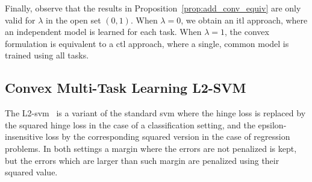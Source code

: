 Finally, observe that the results in Proposition~\ref{prop:add_conv_equiv} are only valid for $\lambda$ in the open set $(0, 1)$. 
When $\lambda=0$, we obtain an \acrshort{itl} approach, where an independent model is learned for each task. When $\lambda=1$, the convex formulation is equivalent to a \acrshort{ctl} approach, where a single, common model is trained using all tasks.






\subsection{Convex Multi-Task Learning L2-SVM}
The L2-\acrshort{svm}~\citep{Burges98} is a variant of the standard \acrshort{svm} where the hinge loss is replaced by the squared hinge loss in the case of a classification setting, and the epsilon-insensitive loss by the corresponding squared version in the case of regression problems. In both settings a margin where the errors are not penalized is kept, but the errors which are larger than such margin are penalized using their squared value.

